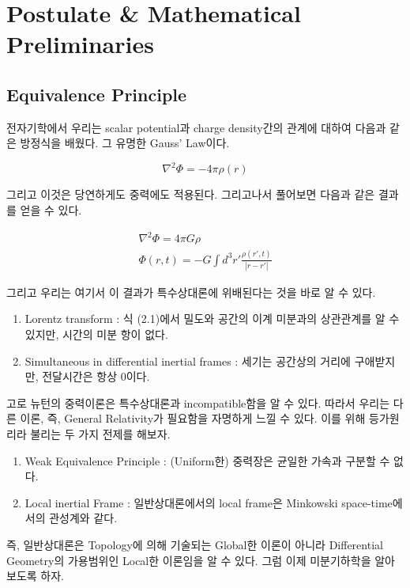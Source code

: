 \documentclass[final]{IEEEphot} %
\numberwithin{equation}{section} %
\numberwithin{figure}{section} %
\numberwithin{table}{section} %
\theoremstyle{plain}
\newcommand{\HS}{\hspace{0.5cm}}
\begin{document}
\section{Postulate \& Mathematical Preliminaries}
\subsection{Equivalence Principle}


\HS 전자기학에서 우리는 scalar potential과 charge density간의 관계에 대하여 다음과 같은 방정식을 배웠다. 그 유명한 Gauss' Law이다.

\begin{equation*}
 \nabla^2 \Phi = -4\pi\rho (r)
\end{equation*}

그리고 이것은 당연하게도 중력에도 적용된다. 그리고나서 풀어보면 다음과 같은 결과를 얻을 수 있다.


\begin{gather}
   \nabla^2 \Phi = 4\pi G \rho \\
   \Phi (r,t) = -G \int d^3 r' \frac{\rho (r',t)}{|r-r'|}
\end{gather}

그리고 우리는 여기서 이 결과가 특수상대론에 위배된다는 것을 바로 알 수 있다.

\begin{enumerate}
 \item Lorentz transform : 식 (2.1)에서 밀도와 공간의 이계 미분과의 상관관계를 알 수 있지만, 시간의 미분 항이 없다.
 \item Simultaneous in differential inertial frames : 세기는 공간상의 거리에 구애받지만, 전달시간은 항상 0이다.
\end{enumerate}

고로 뉴턴의 중력이론은 특수상대론과 incompatible함을 알 수 있다. 따라서 우리는 다른 이론, 즉, General Relativity가 필요함을 자명하게 느낄 수 있다.
이를 위해 등가원리라 불리는 두 가지 전제를 해보자.

\begin{enumerate}
 \item Weak Equivalence Principle : (Uniform한) 중력장은 균일한 가속과 구분할 수 없다.
 \item Local inertial Frame : 일반상대론에서의 local frame은 Minkowski space-time에서의 관성계와 같다.
\end{enumerate}

즉, 일반상대론은 Topology에 의해 기술되는 Global한 이론이 아니라 Differential Geometry의 가용범위인 Local한 이론임을 알 수 있다. \hspace{0.1cm} 그럼 이제 미분기하학을 
알아보도록 하자.
\end{document}
